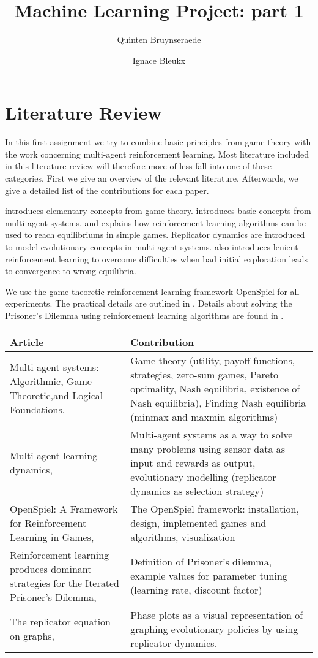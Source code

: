 \documentclass[10pt,a4paper]{article}
\author{Quinten Bruynseraede}
\author{Ignace Bleukx}
\title{Machine Learning Project: part 1}
\begin{document}
\maketitle

\section{Literature Review}
In this first assignment we try to combine basic principles from game theory with the work concerning multi-agent reinforcement learning. Most literature included in this literature review will therefore more of less fall into one of these categories. First we give an overview of the relevant literature. Afterwards, we give a detailed list of the contributions for each paper.

\citet{mas} introduces elementary concepts from game theory. \citet{phdthesis} introduces basic concepts from multi-agent systems, and explains how reinforcement learning algorithms can be used to reach equilibriums in simple games. Replicator dynamics are introduced to model evolutionary concepts in multi-agent systems. \citet{phdthesis} also introduces lenient reinforcement learning to overcome difficulties when bad initial exploration leads to convergence to wrong equilibria.

We use the game-theoretic reinforcement learning framework OpenSpiel for all experiments. The practical details are outlined in \citet{lanctot2019openspiel}. Details about solving the Prisoner's Dilemma using reinforcement learning algorithms are found in \citet{rlforpd}.



\bigskip
\begin{tabular}{|p{4cm}|p{9cm}|}
\hline 
Article & Contribution \\ 
\hline 
\hline
Multi-agent systems: Algorithmic, Game-Theoretic,and Logical Foundations, \citet{mas} & Game theory  (utility, payoff functions, strategies, zero-sum games, Pareto optimality, Nash equilibria, existence of Nash equilibria), Finding Nash equilibria (minmax and maxmin algorithms)  \\ 
\hline 
Multi-agent learning dynamics, \citet{phdthesis} &  Multi-agent systems as a way to solve many problems using sensor data as input and rewards as output, evolutionary modelling (replicator dynamics as selection strategy) \\
\hline 
OpenSpiel: A Framework for Reinforcement Learning in Games, \citet{lanctot2019openspiel} & The OpenSpiel framework: installation, design, implemented games and algorithms, visualization \\ 
\hline 
Reinforcement learning produces dominant strategies for the Iterated Prisoner’s Dilemma, \citet{rlforpd} & Definition of Prisoner's dilemma, example values for parameter tuning (learning rate, discount factor) \\ 
\hline 
The replicator equation on graphs, \citet{Ohtsuki2006TheRE} & Phase plots as a visual representation of graphing evolutionary policies by using replicator dynamics.
\end{tabular} 


{}

\end{document}
